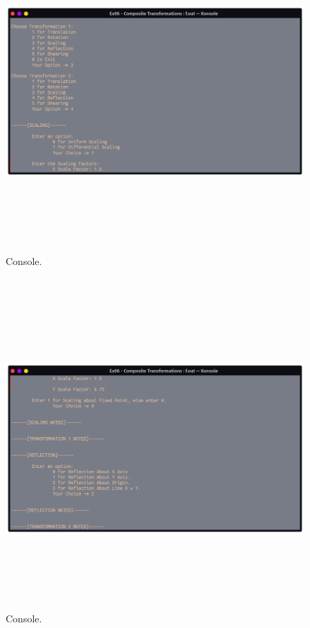 \documentclass[12pt, a4]{article}
\begin{document}
\subsection*{}
\begin{figure}[h]
\centering
\caption{Console.}
\includegraphics[height=12cm, width=17cm]{Outputs/Console-4.png}
\end{figure}

\newpage
\subsection*{}
\begin{figure}[h]
\centering
\caption{Console.}
\includegraphics[height=12cm, width=17cm]{Outputs/Console-5.png}
\end{figure}
\end{document}

